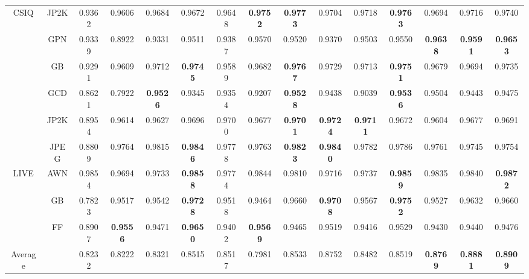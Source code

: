 \begin{table*}[htb]
\begin{tabular}{ccccccccccccccc}
\multirow{2}{*}{CSIQ} & JP2K  & 0.9362          & 0.9606          & 0.9684          & 0.9672          & 0.9648          & \textbf{0.9752} & \textbf{0.9773} & 0.9704          & 0.9718          & \textbf{0.9763} & 0.9694          & 0.9716 & 0.9740                              \\
                      & GPN  & 0.9339          & 0.8922          & 0.9331          & 0.9511          & 0.9387          & 0.9570 & 0.9520          & 0.9370          & 0.9503          & 0.9550          & \textbf{0.9638} & \textbf{0.9591} & \textbf{0.9653}                     \\
                      & GB    & 0.9291          & 0.9609          & 0.9712          & \textbf{0.9745}          & 0.9589          & 0.9682          & \textbf{0.9767} & 0.9729          & 0.9713          & \textbf{0.9751} & 0.9679          & 0.9694 & 0.9735                              \\
                      & GCD   & 0.8621          & 0.7922          & \textbf{0.9526} & 0.9345          & 0.9354          & 0.9207          & \textbf{0.9528}          & 0.9438          & 0.9039          & \textbf{0.9536} & 0.9504          & 0.9443 & 0.9475                              \\ \hline
                      & JP2K  & 0.8954          & 0.9614          & 0.9627          & 0.9696          & 0.9700          & 0.9677          & \textbf{0.9701} & \textbf{0.9724} & \textbf{0.9711} & 0.9672          & 0.9604          & 0.9677 & 0.9691                              \\
                      & JPEG  & 0.8809          & 0.9764          & 0.9815          & \textbf{0.9846} & 0.9778          & 0.9763          & \textbf{0.9823} & \textbf{0.9840} & 0.9782          & 0.9786          & 0.9761          & 0.9745 & 0.9754                              \\
LIVE                  & AWN  & 0.9854 & 0.9694          & 0.9733          & \textbf{0.9858} & 0.9774          & 0.9844          & 0.9810          & 0.9716          & 0.9737          & \textbf{0.9859} & 0.9835          & 0.9840 & \textbf{0.9872}                              \\
                      & GB    & 0.7823          & 0.9517          & 0.9542          & \textbf{0.9728} & 0.9518          & 0.9464          & 0.9660          & \textbf{0.9708} & 0.9567          & \textbf{0.9752} & 0.9527          & 0.9632 & 0.9660                              \\
                      & FF    & 0.8907          & \textbf{0.9556} & 0.9471          & \textbf{0.9650} & 0.9402          & \textbf{0.9569}          & 0.9465          & 0.9519          & 0.9416          & 0.9529 & 0.9430          & 0.9440 & 0.9476     \\
\hline
\rule{0pt}{2ex}                                            
Average & & 0.8232 & 0.8222 & 0.8321 & 0.8515 & 0.8517 & 0.7981 & 0.8533 & 0.8752 & 0.8482 & 0.8519 & \textbf{0.8769} & \textbf{0.8881} & \textbf{0.8909} \\
\hline 
\end{tabular}
\label{results3}
\end{table*}



